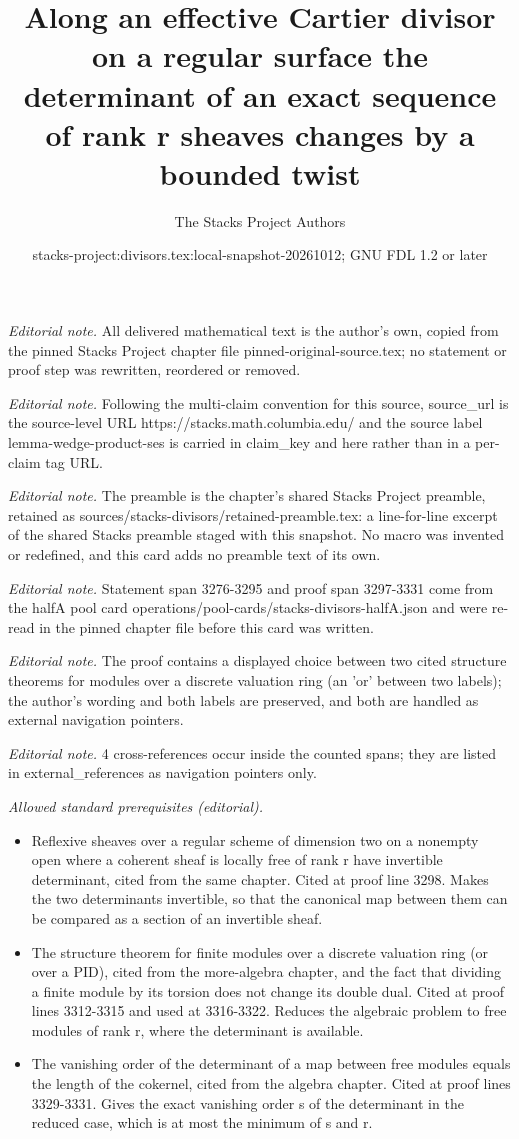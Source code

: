 \documentclass[10pt,a4paper]{amsart}
\title{Along an effective Cartier divisor on a regular surface the determinant of an exact sequence of rank r sheaves changes by a bounded twist}
\author{The Stacks Project Authors}
\date{stacks-project:divisors.tex:local-snapshot-20261012; GNU FDL 1.2 or later}
\theoremstyle{plain}
\theoremstyle{definition}
\theoremstyle{remark}
\numberwithin{equation}{subsection}
\begin{document}
\maketitle
\noindent\textit{Editorial note.} All delivered mathematical text is the author's own, copied from the pinned Stacks Project chapter file pinned-original-source.tex; no statement or proof step was rewritten, reordered or removed.\par\medskip
\noindent\textit{Editorial note.} Following the multi-claim convention for this source, source\_url is the source-level URL https://stacks.math.columbia.edu/ and the source label lemma-wedge-product-ses is carried in claim\_key and here rather than in a per-claim tag URL.\par\medskip
\noindent\textit{Editorial note.} The preamble is the chapter's shared Stacks Project preamble, retained as sources/stacks-divisors/retained-preamble.tex: a line-for-line excerpt of the shared Stacks preamble staged with this snapshot. No macro was invented or redefined, and this card adds no preamble text of its own.\par\medskip
\noindent\textit{Editorial note.} Statement span 3276-3295 and proof span 3297-3331 come from the halfA pool card operations/pool-cards/stacks-divisors-halfA.json and were re-read in the pinned chapter file before this card was written.\par\medskip
\noindent\textit{Editorial note.} The proof contains a displayed choice between two cited structure theorems for modules over a discrete valuation ring (an 'or' between two labels); the author's wording and both labels are preserved, and both are handled as external navigation pointers.\par\medskip
\noindent\textit{Editorial note.} 4 cross-references occur inside the counted spans; they are listed in external\_references as navigation pointers only.\par\medskip
\noindent\textit{Allowed standard prerequisites (editorial).}\begin{itemize}
\item Reflexive sheaves over a regular scheme of dimension two on a nonempty open where a coherent sheaf is locally free of rank r have invertible determinant, cited from the same chapter. Cited at proof line 3298. Makes the two determinants invertible, so that the canonical map between them can be compared as a section of an invertible sheaf.
\item The structure theorem for finite modules over a discrete valuation ring (or over a PID), cited from the more-algebra chapter, and the fact that dividing a finite module by its torsion does not change its double dual. Cited at proof lines 3312-3315 and used at 3316-3322. Reduces the algebraic problem to free modules of rank r, where the determinant is available.
\item The vanishing order of the determinant of a map between free modules equals the length of the cokernel, cited from the algebra chapter. Cited at proof lines 3329-3331. Gives the exact vanishing order s of the determinant in the reduced case, which is at most the minimum of s and r.
\end{itemize}\medskip
\end{document}
